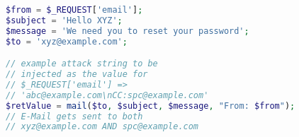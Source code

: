 \begin{lstlisting}[language=PHP,caption={PHP program with e-mail
      header injection vulnerability.},label={code:phpemi}, float]
$from = $_REQUEST['email'];
$subject = 'Hello XYZ';
$message = 'We need you to reset your password';
$to = 'xyz@example.com';

// example attack string to be 
// injected as the value for
// $_REQUEST['email'] => 
// 'abc@example.com\nCC:spc@example.com'
$retValue = mail($to, $subject, $message, "From: $from");
// E-Mail gets sent to both 
// xyz@example.com AND spc@example.com
\end{lstlisting}
